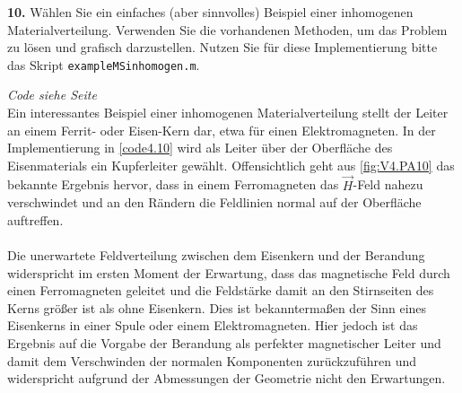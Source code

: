 \documentclass[./Protokollheft.tex]{subfiles}
\begin{document}
\begin{framed}
	 \label{v4.PA.10}
	\noindent \textbf{10.} Wählen Sie ein einfaches (aber sinnvolles) Beispiel einer inhomogenen Materialverteilung. Verwenden Sie die vorhandenen Methoden, um das
Problem zu lösen und grafisch darzustellen. Nutzen Sie für diese Implementierung bitte das Skript \lstinline{exampleMSinhomogen.m}.\label{exer:Hfield4inhomogenMaterial}
\end{framed}

\textit{ Code siehe Seite \pageref{code4.10} } \\
Ein interessantes Beispiel einer inhomogenen Materialverteilung stellt der Leiter an einem Ferrit- oder Eisen-Kern dar, etwa für einen Elektromagneten. In der Implementierung in \ref{code4.10} wird als Leiter über der Oberfläche des Eisenmaterials ein Kupferleiter gewählt. Offensichtlich geht aus \ref{fig:V4.PA10} das bekannte Ergebnis hervor, dass in einem Ferromagneten das $\vec{H}$-Feld nahezu verschwindet und an den Rändern die Feldlinien normal auf der Oberfläche auftreffen.
\\
\\
Die unerwartete Feldverteilung zwischen dem Eisenkern und der Berandung widerspricht im ersten Moment der Erwartung, dass das magnetische Feld durch einen Ferromagneten geleitet und die Feldstärke damit an den Stirnseiten des Kerns größer ist als ohne Eisenkern. Dies ist bekanntermaßen der Sinn eines Eisenkerns in einer Spule oder einem Elektromagneten.
Hier jedoch ist das Ergebnis auf die Vorgabe der Berandung als perfekter magnetischer Leiter und damit dem Verschwinden der normalen Komponenten zurückzuführen und widerspricht aufgrund der Abmessungen der Geometrie nicht den Erwartungen. 
\end{document}
